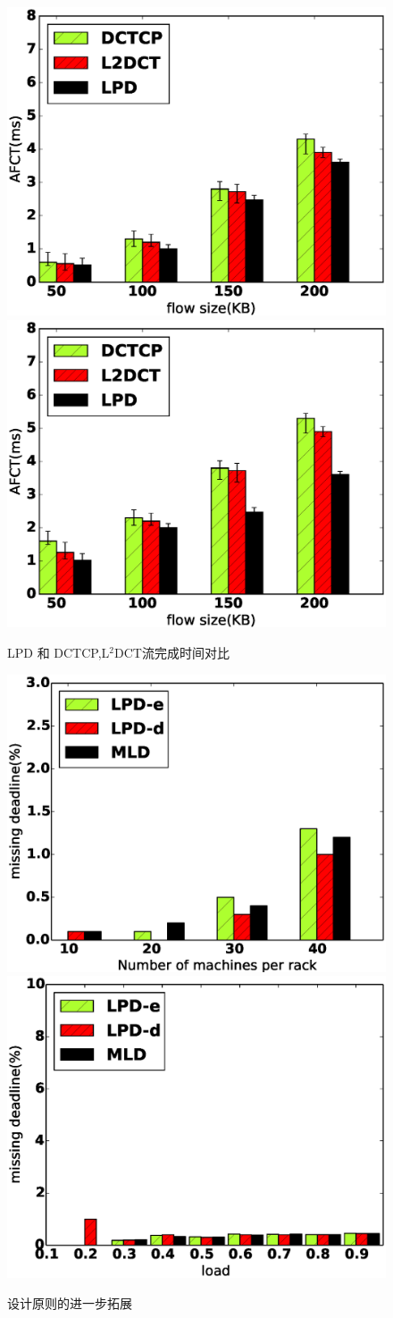 \begin{figure}[h]
\centering
{}
 {\includegraphics[width=0.45\columnwidth]{figures/LPD/Realtest/fct_1.eps}}
{\includegraphics[width=0.45\columnwidth]{figures/LPD/Realtest/fct_2.eps}}
\caption{LPD 和 DCTCP,L$^2$DCT流完成时间对比}
\label{testbed-fct-fig}
\end{figure}

\begin{figure}[h]
\centering
{}
 {\includegraphics[width=0.45\columnwidth]{figures/LPD/evaluation_3/lpd.eps}}
{\includegraphics[width=0.45\columnwidth]{figures/LPD/discussion/diss_miss_deadline_.eps}}
\caption{设计原则的进一步拓展}
\label{discussion-fig}
\end{figure}


